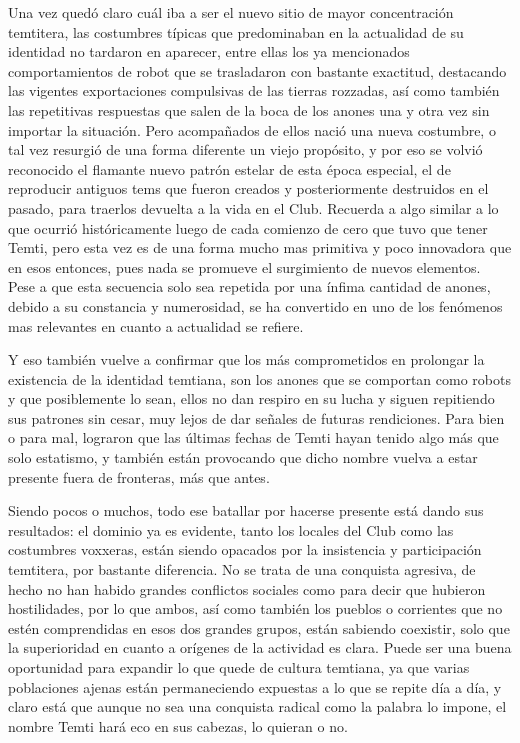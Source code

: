 \documentclass[
  spanish,
]{book}
\begin{document}
Una vez quedó claro cuál iba a ser el nuevo sitio de mayor concentración temtitera, las costumbres típicas que predominaban en la actualidad de su identidad no tardaron en aparecer, entre ellas los ya mencionados comportamientos de robot que se trasladaron con bastante exactitud, destacando las vigentes exportaciones compulsivas de las tierras rozzadas, así como también las repetitivas respuestas que salen de la boca de los anones una y otra vez sin importar la situación.
Pero acompañados de ellos nació una nueva costumbre, o tal vez resurgió de una forma diferente un viejo propósito, y por eso se volvió reconocido el flamante nuevo patrón estelar de esta época especial, el de reproducir antiguos tems que fueron creados y posteriormente destruidos en el pasado, para traerlos devuelta a la vida en el Club.
Recuerda a algo similar a lo que ocurrió históricamente luego de cada comienzo de cero que tuvo que tener Temti, pero esta vez es de una forma mucho mas primitiva y poco innovadora que en esos entonces, pues nada se promueve el surgimiento de nuevos elementos. Pese a que esta secuencia solo sea repetida por una ínfima cantidad de anones, debido a su constancia y numerosidad, se ha convertido en uno de los fenómenos mas relevantes en cuanto a actualidad se refiere.

Y eso también vuelve a confirmar que los más comprometidos en prolongar la existencia de la identidad temtiana, son los anones que se comportan como robots y que posiblemente lo sean, ellos no dan respiro en su lucha y siguen repitiendo sus patrones sin cesar, muy lejos de dar señales de futuras rendiciones. Para bien o para mal, lograron que las últimas fechas de Temti hayan tenido algo más que solo estatismo, y también están provocando que dicho nombre vuelva a estar presente fuera de fronteras, más que antes.

Siendo pocos o muchos, todo ese batallar por hacerse presente está dando sus resultados: el dominio ya es evidente, tanto los locales del Club como las costumbres voxxeras, están siendo opacados por la insistencia y participación temtitera, por bastante diferencia. No se trata de una conquista agresiva, de hecho no han habido grandes conflictos sociales como para decir que hubieron hostilidades, por lo que ambos, así como también los pueblos o corrientes que no estén comprendidas en esos dos grandes grupos, están sabiendo coexistir, solo que la superioridad en cuanto a orígenes de la actividad es clara.
Puede ser una buena oportunidad para expandir lo que quede de cultura temtiana, ya que varias poblaciones ajenas están permaneciendo expuestas a lo que se repite día a día, y claro está que aunque no sea una conquista radical como la palabra lo impone, el nombre Temti hará eco en sus cabezas, lo quieran o no.
\end{document}
